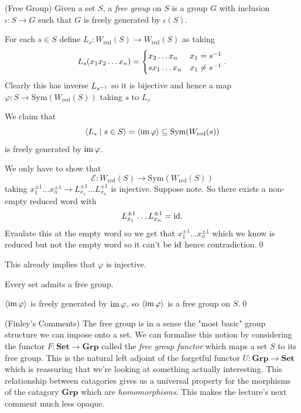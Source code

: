 \documentclass{article}
\begin{document}
\begin{definition}
	(Free Group) Given a set $ S $, a \textit{free group} on $ S $ is a group $ G $ with inclusion $ \iota: S \to G $ such that $ G $ is freely generated by $ \iota(S) $.
\end{definition}
For each $ s\in S $ define $ L_s:W_{\mathrm{red}}(S) \to W_{\mathrm{red}}(S) $ as taking 
\[
  L_s(x_1x_2\dots x_n) = \begin{cases}
	  x_2\dots x_n & x_1 = {s}^{-1} \\
	  s x_1\dots x_n & x_1 \ne {s}^{-1}
  \end{cases}.
\]
Clearly this has inverse $ L_{{s}^{-1}} $ so it is bijective and hence a map $ \varphi: S \to \mathrm{Sym}(W_{\mathrm{red}}(S)) $ taking $ s $ to $ L_s $
\begin{claim}
	We claim that
  \[
	  \langle L_s \mid s\in S \rangle = \langle \operatorname{im} \varphi \rangle \subseteq \mathrm{Sym}(W_{\mathrm{red}}(s))
  \]
  is freely generated by $ \operatorname{im} \varphi $.
\end{claim}
\pf We only have to show that
\[
	\mathcal E: W_{\mathrm{red}}(S) \to \mathrm{Sym}(W_{\mathrm{red}}(S))
\]
taking $ x_1^{\pm 1} \dots x_n^{\pm 1} \to L_{x_1}^{\pm 1} \dots L_{x_n}^{\pm 1} $ is injective. Suppose note. So there exists a non-empty reduced word with 
\[
	L_{x_1}^{\pm 1 }\dots L_{x_n}^{\pm 1} = \mathrm{id}.
\]
Evaulate this at the empty word so we get that $ x_1^{\pm 1}\dots x_n^{\pm 1} $ which we know is reduced but not the empty word so it can't be $ \mathrm{id} $ hence contradiction.\qed
\par
This already implies that $ \varphi $ is injective.
\begin{lemma}
  Every set admits a free group.
\end{lemma}
\pf $ \langle \operatorname{im} \varphi\rangle $ is freely generated by $ \operatorname{im} \varphi $, so $ \langle \operatorname{im} \varphi\rangle $ is a free group on $ S $.\qed
\begin{remark}
	(Finley's Comments) The free group is in a sense the "most basic" group structure we can impose onto a set. We can formalise this notion by considering the functor $ F: \mathbf{Set} \to \mathbf{Grp} $ called the \textit{free group functor} which maps a set $ S $ to its free group. This is the natural left adjoint of the forgetful functor $ U: \mathbf{Grp} \to \mathbf{Set} $ which is reassuring that we're looking at something actually interesting. This relationship between catagories gives us a universal property for the morphisms of the catagory $ \mathbf{Grp} $ which are \textit{homomorphisms}. This makes the lecture's next comment much less opaque. 
\end{remark}
\end{document}
